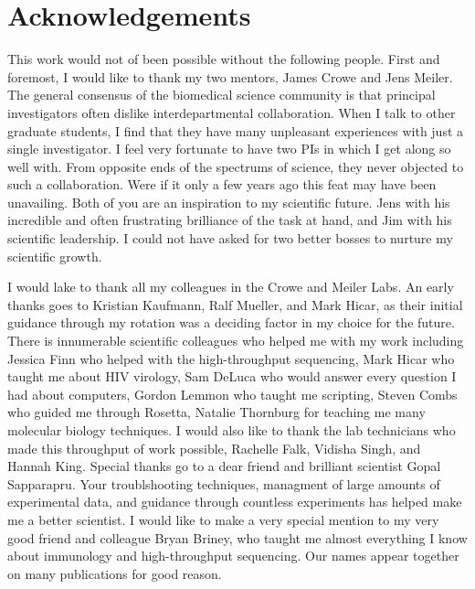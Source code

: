 \chapter*{Acknowledgements}
\vspace{7mm}
This work would not of been possible without the following people.
First and foremost, I would like to thank my two mentors, James Crowe and Jens Meiler. The general consensus of the biomedical science community is that principal investigators often dislike interdepartmental collaboration. When I talk to other graduate students, I find that they have many unpleasant experiences with just a single investigator. I feel very fortunate to have two PIs in which I get along so well with. From opposite ends of the spectrums of science, they never objected to such a collaboration. Were if it only a few years ago this feat may have been unavailing. Both of you are an inspiration to my scientific future. Jens with his incredible and often frustrating brilliance of the task at hand, and Jim with his scientific leadership. I could not have asked for two better bosses to nurture my scientific growth.

I would lake to thank all my colleagues in the Crowe and Meiler Labs. An early thanks goes to Kristian Kaufmann, Ralf Mueller, and Mark Hicar, as their initial guidance through my rotation was a deciding factor in my choice for the future. There is innumerable scientific colleagues who helped me with my work including Jessica Finn who helped with the high-throughput sequencing, Mark Hicar who taught me about HIV virology, Sam DeLuca who would answer every question I had about computers, Gordon Lemmon who taught me scripting, Steven Combs who guided me through Rosetta, Natalie Thornburg for teaching me many molecular biology techniques. I would also like to thank the lab technicians who made this throughput of work possible, Rachelle Falk, Vidisha Singh, and Hannah King. Special thanks go to a dear friend and brilliant scientist Gopal Sapparapru. Your troublshooting techniques, managment of large amounts of experimental data, and guidance through countless experiments has helped make me a better scientist. I would like to make a very special mention to my very good friend and colleague Bryan Briney, who taught me almost everything I know about immunology and high-throughput sequencing. Our names appear together on many publications for good reason.


